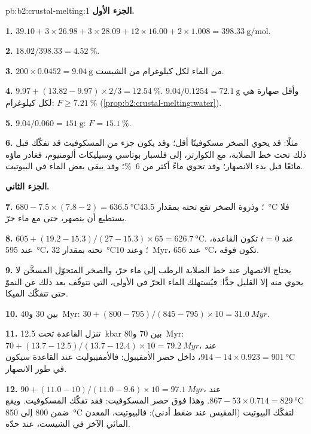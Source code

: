\begin{solution}{pb:b2:crustal-melting:1}
\noindent\textbf{الجزء الأول.}

\textbf{1.} $39.10 + 3\times26.98 + 3\times28.09 + 12\times16.00 + 2\times1.008 =
\qty{398.33}{\gram\per\mole}$.

\textbf{2.} $18.02/398.33 = \qty{4.52}{\percent}$.

\textbf{3.} $200\times0.0452 = \qty{9.04}{\gram}$ من الماء لكل كيلوغرام من الشيست.

\textbf{4.} $9.97 + (13.82 - 9.97)\times2/3 = \qty{12.54}{\percent}$. وأقل صهارة هي
$9.04/0.1254 = \qty{72.1}{\gram}$ لكل كيلوغرام: $F \ge \qty{7.21}{\percent}$
(\cref{prop:b2:crustal-melting:water}).

\textbf{5.} $9.04/0.060 = \qty{151}{\gram}$: $F = \qty{15.1}{\percent}$.

\textbf{6.} مثلًا: قد يحوي الصخر مسكوفيتًا أقل؛ وقد يكون جزء من المسكوفيت
قد تفكّك قبل ذلك تحت خط الصلابة، مع الكوارتز، إلى فلسبار بوتاسي
وسيليكات ألومنيوم، فغادر ماؤه مائعًا قبل بدء الانصهار؛ وقد تحوي  ماءً
أكثر من \qty{6}{\percent}؛ وقد يبقى بعض الماء في البيوتيت.

\noindent\textbf{الجزء الثاني.}

\textbf{7.} $680 - 7.5\times(7.8 - 2) = \qty{636.5}{\celsius}$؛ وذروة الصخر تقع
تحته بمقدار \qty{43.5}{\celsius} فلا يستطيع أن ينصهر، حتى مع ماء حرّ.

\textbf{8.} $605 + (19.2 - 15.3)/(27 - 15.3)\times65 = \qty{626.7}{\celsius}$. عند
$t = 0$ تكون القاعدة، عند \qty{595}{\celsius}، تحته بمقدار \qty{32}{\celsius}؛ وعند
\qty{10}{Myr}، عند \qty{656}{\celsius}، تكون فوقه.

\textbf{9.} يحتاج الانصهار عند خط الصلابة الرطب إلى ماء حرّ، والصخر المتحوّل المسخَّن
لا يحوي منه إلا القليل جدًّا: فيُستهلك الماء الحرّ في  الأولى، التي تتوقّف بعد ذلك عن النموّ
حتى تتفكّك الميكا.

\textbf{10.} بين 30 و\qty{40}{Myr}: $30 + (800 - 795)/(845 - 795)\times10 =
\qty{31.0}{Myr}$.

\textbf{11.} تنزل القاعدة تحت \qty{12.5}{kbar} بين 70 و\qty{80}{Myr}:
$70 + (13.7 - 12.5)/(13.7 - 12.4)\times10 = \qty{79.2}{Myr}$، عند
$914 - 14\times0.923 = \qty{901}{\celsius}$، داخل حصر الأمفيبول: فالأمفيبوليت
عند القاعدة سيكون في طور الانصهار.

\textbf{12.} $90 + (11.0 - 10)/(11.0 - 9.6)\times10 = \qty{97.1}{Myr}$، عند $867 -
53\times0.714 = \qty{829}{\celsius}$. وهذا فوق حصر المسكوفيت: فقد تفكّك المسكوفيت.
ويقع ضمن 800 إلى \qty{850}{\celsius} لتفكّك البيوتيت
(المقيس عند ضغط أدنى): فالبيوتيت، المعدن المائي الآخر في الشيست، عند
حدّه.


\end{solution}
